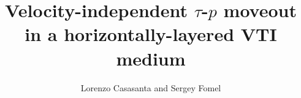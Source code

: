 
\newcommand{\tick}{\ding{51}}
\newcommand{\taup}{$\tau$-$p$~}
\newcommand{\tx}{$t$-$X$~}
\def\quotetation#1{``#1''}

\title{Velocity-independent $\tau$-$p$ moveout 
in a horizontally-layered VTI medium } 


\author{Lorenzo Casasanta and Sergey Fomel}

\address{
\footnotemark[1]formerly: Politecnico di Milano \\
Piazza Leonardo da Vinci, 32 \\
20133 Milano \\ Italy \\
casasanta@elet.polimi.it \\ 
presently: CGGVeritas Services \\
Crompton Way, Manor Royal Estate \\
Crawley, West Sussex RH10 9QN \\UK \\
lorenzo.casasanta@cggveritas.com \\
\footnotemark[2]Bureau of Economic Geology, \\
John A. and Katherine G. Jackson School of Geosciences \\
The University of Texas at Austin \\
University Station, Box X \\
Austin, TX 78713-8972 \\ USA \\
sergey.fomel@beg.utexas.edu
}

\maketitle

%














